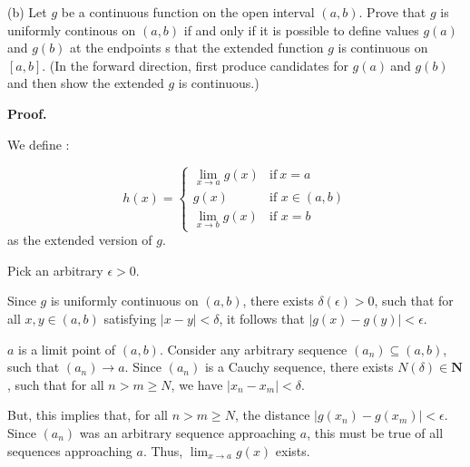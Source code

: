 \documentclass[10pt]{article}
\begin{document}
(b) Let $\displaystyle g$ be a continuous function on the open interval $\displaystyle ( a,b)$. Prove that $\displaystyle g$ is uniformly continous on $\displaystyle ( a,b)$ if and only if it is possible to define values $\displaystyle g( a)$ and $\displaystyle g( b)$ at the endpoints s that the extended function $\displaystyle g$ is continuous on $\displaystyle [ a,b]$. (In the forward direction, first produce candidates for $\displaystyle g( a) \ $and $\displaystyle g( b)$ and then show the extended $\displaystyle g$ is continuous.)



\textbf{Proof.}



We define :




\begin{equation*}
h( x) =\begin{cases}
\lim _{x\rightarrow a} g( x) & \text{if} \ x=a\\
g( x) & \text{if } x\in ( a,b)\\
\lim _{x\rightarrow b} g( x) & \text{if } x=b
\end{cases}
\end{equation*}
as the extended version of $\displaystyle g$. 



Pick an arbitrary $\displaystyle \epsilon  >0$.

Since $\displaystyle g$ is uniformly continuous on $\displaystyle ( a,b)$, there exists $\displaystyle \delta ( \epsilon )  >0$, such that for all $\displaystyle x,y\in ( a,b)$ satisfying $\displaystyle |x-y|< \delta $, it follows that $\displaystyle |g( x) -g( y) |< \epsilon $.



$\displaystyle a$ is a limit point of $\displaystyle ( a,b)$. Consider any arbitrary sequence $\displaystyle ( a_{n}) \subseteq ( a,b)$, such that $\displaystyle ( a_{n})\rightarrow a$. Since $\displaystyle ( a_{n})$ is a Cauchy sequence, there exists $\displaystyle N( \delta ) \in \mathbf{N}$, such that for all $\displaystyle n >m\geq N$, we have $\displaystyle |x_{n} -x_{m} |< \delta $.



But, this implies that, for all $\displaystyle n >m\geq N$, the distance $\displaystyle |g( x_{n}) -g( x_{m}) |< \epsilon $. Since $\displaystyle ( a_{n})$ was an arbitrary sequence approaching $\displaystyle a$, this must be true of all sequences approaching $\displaystyle a$. Thus, $\displaystyle \lim _{x\rightarrow a} g( x)$ exists. 
\end{document}
